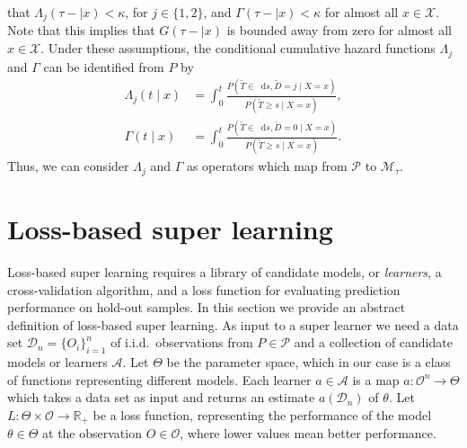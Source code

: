 \documentclass[a4paper,danish]{article}
\theoremstyle{plain} %
\numberwithin{theorem}{section}
\theoremstyle{definition} %
\theoremstyle{remark}
\newcommand{\R}{\mathbb{R}}
\newcommand*\diff{\mathop{}\!\mathrm{d}}
\newcommand{\1}{\mathds{1}}
\newcommand{\data}{\ensuremath{\mathcal{D}}}
\begin{document}
that \(\Lambda_{j}(\tau- \mid x)<\kappa \), for \(j\in\{1,2\}\), and
\(\Gamma(\tau- \mid x)<\kappa\) for almost all \(x\in\mathcal
X\). Note that this implies that \(G(\tau- \mid x)\) is bounded away
from zero for almost all \(x\in\mathcal X\).  Under these assumptions,
the conditional cumulative hazard functions \(\Lambda_{j}\) and
\(\Gamma\) can be identified from \(P\) by
\begin{align}
  \Lambda_{j}(t \mid x) &= \int_0^t\frac{  P(\tilde T \in \diff s, \tilde D=j \mid X=x )}{P(\tilde T \geq s \mid X=x )}, \label{eq:lambdaj}\\
  \Gamma(t \mid x) &= \int_0^t\frac{  P(\tilde T \in \diff s, \tilde D=0 \mid X=x )}{P(\tilde T \geq s \mid X=x )}\label{eq:gamma}.
\end{align}
Thus, we can consider $\Lambda_j$ and \(\Gamma\) as operators which map from
\( \mathcal{P} \) to \(\mathcal M_{\tau}\).

\section{Loss-based super learning}
\label{sec:super-learning}

Loss-based super learning requires a library of candidate models, or
\textit{learners}, a cross-validation algorithm, and a loss function
for evaluating prediction performance on hold-out samples. In this
section we provide an abstract definition of loss-based super
learning. As input to a super learner we need a data set
\( \data_n=\{O_i\}_{i=1}^n \) of i.i.d.\ observations from
\( P \in \mathcal{P} \) and a collection of candidate models or
learners $\mathcal{A}$. Let \(\Theta\) be the parameter space, which
in our case is a class of functions representing different models.
Each learner \(a \in \mathcal{A}\) is a map
\( a \colon \mathcal{O}^n \rightarrow \Theta \) which takes a data set
as input and returns an estimate $a(\data_n)$ of $\theta$. Let
\(L\colon \Theta \times \mathcal{O} \rightarrow \R_+\) be a loss
function, representing the performance of the model
$\theta \in \Theta$ at the observation \( O \in \mathcal{O} \), where
lower values mean better performance.
\end{document}
